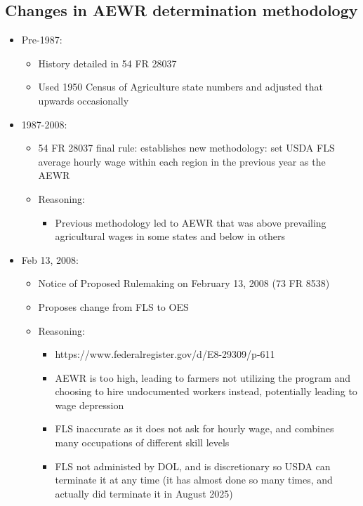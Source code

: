 \documentclass[14pt]{article}
\begin{document}
\subsection{Changes in AEWR determination methodology}
\begin{itemize}
	\item Pre-1987:
	      \begin{itemize}
		      \item History detailed in 54 FR 28037
		      \item Used 1950 Census of Agriculture state numbers and adjusted that upwards occasionally
	      \end{itemize}
	\item 1987-2008:
	      \begin{itemize}
		      \item 54 FR 28037 final rule: establishes new methodology: set USDA FLS average hourly wage within each region in the previous year as the AEWR
		      \item Reasoning:
		            \begin{itemize}
			            \item Previous methodology led to AEWR that was above prevailing agricultural wages in some states and below in others
		            \end{itemize}
	      \end{itemize}
	\item Feb 13, 2008:
	      \begin{itemize}
		      \item Notice of Proposed Rulemaking on February 13, 2008 (73 FR 8538)
		      \item Proposes change from FLS to OES
		      \item Reasoning:
		            \begin{itemize}
			            \item https://www.federalregister.gov/d/E8-29309/p-611
			            \item AEWR is too high, leading to farmers not utilizing the program and choosing to hire undocumented workers instead, potentially leading to wage depression
			            \item FLS inaccurate as it does not ask for hourly wage, and combines many occupations of different skill levels
			            \item FLS not administed by DOL, and is discretionary so USDA can terminate it at any time (it has almost done so many times, and actually did terminate it in August 2025)

\end{itemize}
\end{itemize}
\end{itemize}
\end{document}
